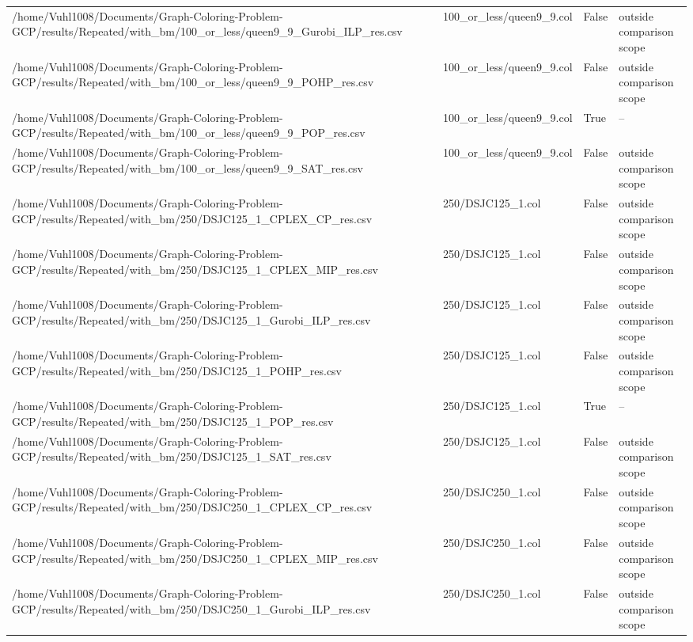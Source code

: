 \begin{table}[htbp]
\begin{tabular}{llll}
/home/Vuhl1008/Documents/Graph-Coloring-Problem-GCP/results/Repeated/with\_bm/100\_or\_less/queen9\_9\_Gurobi\_ILP\_res.csv & 100\_or\_less/queen9\_9.col & False & outside comparison scope \\
/home/Vuhl1008/Documents/Graph-Coloring-Problem-GCP/results/Repeated/with\_bm/100\_or\_less/queen9\_9\_POHP\_res.csv & 100\_or\_less/queen9\_9.col & False & outside comparison scope \\
/home/Vuhl1008/Documents/Graph-Coloring-Problem-GCP/results/Repeated/with\_bm/100\_or\_less/queen9\_9\_POP\_res.csv & 100\_or\_less/queen9\_9.col & True & -- \\
/home/Vuhl1008/Documents/Graph-Coloring-Problem-GCP/results/Repeated/with\_bm/100\_or\_less/queen9\_9\_SAT\_res.csv & 100\_or\_less/queen9\_9.col & False & outside comparison scope \\
/home/Vuhl1008/Documents/Graph-Coloring-Problem-GCP/results/Repeated/with\_bm/250/DSJC125\_1\_CPLEX\_CP\_res.csv & 250/DSJC125\_1.col & False & outside comparison scope \\
/home/Vuhl1008/Documents/Graph-Coloring-Problem-GCP/results/Repeated/with\_bm/250/DSJC125\_1\_CPLEX\_MIP\_res.csv & 250/DSJC125\_1.col & False & outside comparison scope \\
/home/Vuhl1008/Documents/Graph-Coloring-Problem-GCP/results/Repeated/with\_bm/250/DSJC125\_1\_Gurobi\_ILP\_res.csv & 250/DSJC125\_1.col & False & outside comparison scope \\
/home/Vuhl1008/Documents/Graph-Coloring-Problem-GCP/results/Repeated/with\_bm/250/DSJC125\_1\_POHP\_res.csv & 250/DSJC125\_1.col & False & outside comparison scope \\
/home/Vuhl1008/Documents/Graph-Coloring-Problem-GCP/results/Repeated/with\_bm/250/DSJC125\_1\_POP\_res.csv & 250/DSJC125\_1.col & True & -- \\
/home/Vuhl1008/Documents/Graph-Coloring-Problem-GCP/results/Repeated/with\_bm/250/DSJC125\_1\_SAT\_res.csv & 250/DSJC125\_1.col & False & outside comparison scope \\
/home/Vuhl1008/Documents/Graph-Coloring-Problem-GCP/results/Repeated/with\_bm/250/DSJC250\_1\_CPLEX\_CP\_res.csv & 250/DSJC250\_1.col & False & outside comparison scope \\
/home/Vuhl1008/Documents/Graph-Coloring-Problem-GCP/results/Repeated/with\_bm/250/DSJC250\_1\_CPLEX\_MIP\_res.csv & 250/DSJC250\_1.col & False & outside comparison scope \\
/home/Vuhl1008/Documents/Graph-Coloring-Problem-GCP/results/Repeated/with\_bm/250/DSJC250\_1\_Gurobi\_ILP\_res.csv & 250/DSJC250\_1.col & False & outside comparison scope \\

\end{tabular}
\end{table}
